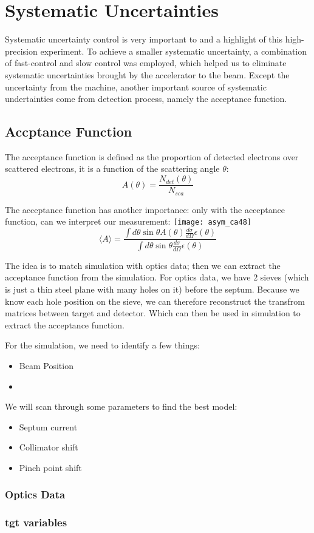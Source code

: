 \section{Systematic Uncertainties}
Systematic uncertainty control is very important to and a highlight of this 
high-precision experiment. To achieve a smaller systematic uncertainty, a
combination of fast-control and slow control was employed, which helped us
to eliminate systematic uncertainties brought by the accelerator to the
beam. Except the uncertainty from the machine, another important source
of systematic undertainties come from detection process, namely the 
acceptance function.

\subsection{Accptance Function}
The acceptance function is defined as the proportion of detected electrons
over scattered electrons, it is a function of the scattering angle $\theta$:
$$ A(\theta) = \frac{N_{det}(\theta)}{N_{sca}} $$

The acceptance function has another importance: only with the acceptance
function, can we interpret our measurement:
\texttt{[image: asym\_ca48]}
\begin{equation*}
    \langle A \rangle = \frac{\int d\theta \sin\theta A(\theta) \frac{d\sigma}{d\Omega} \epsilon(\theta)}{\int d\theta \sin\theta \frac{d\sigma}{d\Omega} \epsilon(\theta)}
\end{equation*}

The idea is to match simulation with optics data; then we can extract the 
acceptance function from the simulation. For optics data, we have 2 sieves
(which is just a thin steel plane with many holes on it) before the septum.
Because we know each hole position on the sieve, we can therefore reconstruct
the transfrom matrices between target and detector. Which can then be used in
simulation to extract the acceptance function.

For the simulation, we need to identify a few things:
\begin{itemize}
    \item Beam Position
    \item 
\end{itemize}

We will scan through some parameters to find the best model:
\begin{itemize}
    \item Septum current
    \item Collimator shift
    \item Pinch point shift
\end{itemize}

\subsubsection{Optics Data}
\subsubsection{tgt variables}

